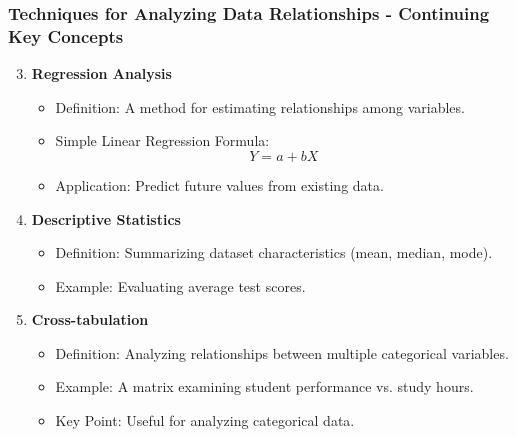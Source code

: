 \documentclass[aspectratio=169]{beamer}
\begin{document}
\begin{frame}[fragile]
    \frametitle{Techniques for Analyzing Data Relationships - Continuing Key Concepts}
    \begin{enumerate}
        \setcounter{enumi}{2}
        \item \textbf{Regression Analysis}
            \begin{itemize}
                \item Definition: A method for estimating relationships among variables.
                \item Simple Linear Regression Formula: 
                    \begin{equation}
                        Y = a + bX
                    \end{equation}
                \item Application: Predict future values from existing data.
            \end{itemize}

        \item \textbf{Descriptive Statistics}
            \begin{itemize}
                \item Definition: Summarizing dataset characteristics (mean, median, mode).
                \item Example: Evaluating average test scores.
            \end{itemize}
        
        \item \textbf{Cross-tabulation}
            \begin{itemize}
                \item Definition: Analyzing relationships between multiple categorical variables.
                \item Example: A matrix examining student performance vs. study hours.
                \item Key Point: Useful for analyzing categorical data.
            \end{itemize}
    \end{enumerate}
\end{frame}
\end{document}
